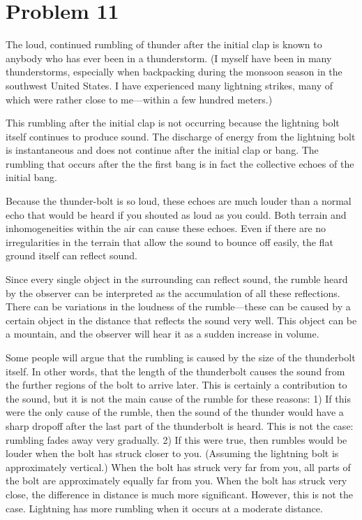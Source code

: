 \documentclass[12pt]{article}
\begin{document}
\section*{Problem 11}

The loud, continued rumbling of thunder after the initial clap is known to anybody who has ever been in a thunderstorm.  (I myself have been in many thunderstorms, especially when backpacking during the monsoon season in the southwest United States.  I have experienced many lightning strikes, many of which were rather close to me---within a few hundred meters.)

This rumbling after the initial clap is not occurring because the lightning bolt itself continues to produce sound.  The discharge of energy from the lightning bolt is instantaneous and does not continue after the initial clap or bang.  The rumbling that occurs after the the first bang is in fact the collective echoes of the initial bang.

Because the thunder-bolt is so loud, these echoes are much louder than a normal echo that would be heard if you shouted as loud as you could.  Both terrain and inhomogeneities within the air can cause these echoes.  Even if there are no irregularities in the terrain that allow the sound to bounce off easily, the flat ground itself can reflect sound.  

Since every single object in the surrounding can reflect sound, the rumble heard by the observer can be interpreted as the accumulation of all these reflections.  There can be variations in the loudness of the rumble---these can be caused by a certain object in the distance that reflects the sound very well.  This object can be a mountain, and the observer will hear it as a sudden increase in volume.

Some people will argue that the rumbling is caused by the size of the thunderbolt itself.  In other words, that the length of the thunderbolt causes the sound from the further regions of the bolt to arrive later.  This is certainly a contribution to the sound, but it is not the main cause of the rumble for these reasons: 1) If this were the only cause of the rumble, then the sound of the thunder would have a sharp dropoff after the last part of the thunderbolt is heard.  This is not the case: rumbling fades away very gradually.  2) If this were true, then rumbles would be louder when the bolt has struck closer to you.  (Assuming the lightning bolt is approximately vertical.)  When the bolt has struck very far from you, all parts of the bolt are approximately equally far from you.  When the bolt has struck very close, the difference in distance is much more significant.  However, this is not the case.  Lightning has more rumbling when it occurs at a moderate distance.  
\end{document}
